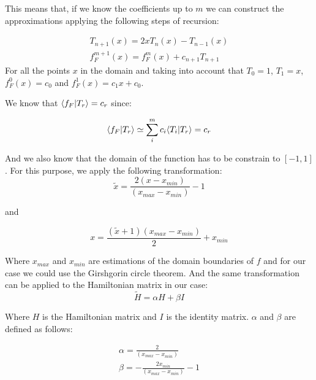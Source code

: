 This means that, if we know the coefficients up to $m$ we can construct the approximations applying the following steps of recursion: 

\begin{equation}
  \begin{array}{ccc}    
    T_{n+1}(x) = 2xT_n(x) - T_{n-1}(x)  \\
    f^{m+1}_F(x) = f^m_F(x) + c_{n+1}T_{n+1}
  \end{array}    
\end{equation}
For all the points $x$ in the domain and taking into account that $T_0 = 1$, $T_1=x$, $f^0_F(x) = c_0$ and $f^1_F(x) = c_1x + c_0$.

We know that $\langle f_F | T_r \rangle = c_r$ since: 

\begin{equation}
  \langle f_F | T_r \rangle \simeq \sum_i^m c_i \langle T_i | T_r \rangle = c_r
\end{equation}

And we also know that the domain of the function has to be constrain to $[-1,1]$. For this purpose, we apply the following transformation:
\begin{equation}
  \tilde{x} = \frac{2(x-x_{min})} {(x_{max}-x_{min})} - 1
\end{equation}

and 

\begin{equation}
  x = \frac{(\tilde{x} + 1)(x_{max}-x_{min})}{2}  + x_{min}
  \label{x}
\end{equation}


Where $x_{max}$ and $x_{min}$ are estimations of the domain boundaries of $f$ and for our case we could use the Girshgorin circle theorem. And the same transformation can be applied to the Hamiltonian matrix in our case: 
\begin{equation}
  \tilde{H} = \alpha H  +  \beta I
\end{equation}

Where $H$ is the Hamiltonian matrix and $I$ is the identity matrix. $\alpha$ and $\beta$ are defined as follows: 

\begin{equation}
  \begin{array}{ccc}    
  \alpha = \frac{2}{(x_{max}-x_{min})} \\
  \beta = - \frac{2x_{min}}{(x_{max}-x_{min})} - 1
  \end{array}
\end{equation}

